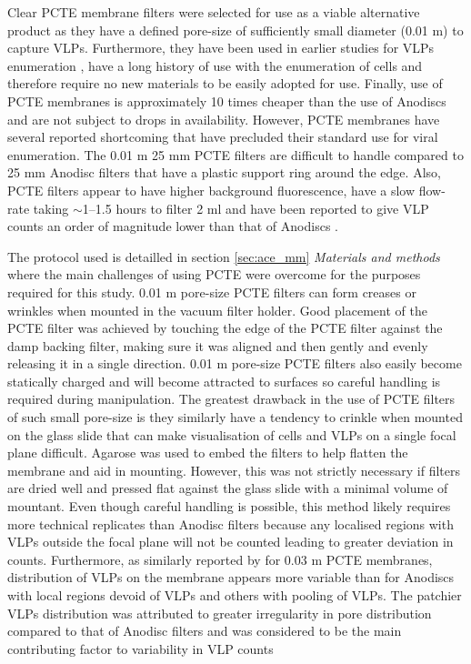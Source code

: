 Clear \ac{PCTE} membrane filters were selected for use as a viable alternative product as they have a defined pore-size of sufficiently small diameter (0.01 \textmu{}m) to capture \acp{VLP}. 
Furthermore, they have been used in earlier studies for \acp{VLP} enumeration \cite{Hara1991, Proctor1992}, have a long history of use with the enumeration of cells \cite{Hobbie1977} and therefore require no new materials to be easily adopted for use.
Finally, use of \ac{PCTE} membranes is approximately 10 times cheaper than the use of Anodiscs and are not subject to drops in availability.
However, \ac{PCTE} membranes have several reported shortcoming that have precluded their standard use for viral enumeration.
The 0.01 \textmu{}m 25 mm \ac{PCTE} filters are difficult to handle compared to 25 mm Anodisc filters that have a plastic support ring around the edge.
Also, \ac{PCTE} filters appear to have higher background fluorescence, have a slow flow-rate taking $\sim$1--1.5 hours to filter 2 ml \cite{Hara1991} and have been reported to give \ac{VLP} counts an order of magnitude lower than that of Anodiscs \cite{Budinoff2011}.%

The protocol used is detailled in section \ref{sec:ace_mm} \emph{Materials and methods} where the main challenges of using \ac{PCTE} were overcome for the purposes required for this study.
0.01 \textmu{}m pore-size \ac{PCTE} filters can form creases or wrinkles when mounted in the vacuum filter holder.
Good placement of the \ac{PCTE} filter was achieved by touching the edge of the \ac{PCTE} filter against the damp backing filter, making sure it was aligned and then gently and evenly releasing it in a single direction. 
0.01 \textmu{}m pore-size \ac{PCTE} filters also easily become statically charged and will become attracted to surfaces so careful handling is required during manipulation. 
The greatest drawback in the use of \ac{PCTE} filters of such small pore-size is they similarly have a tendency to crinkle when mounted on the glass slide that can make visualisation of cells and \acp{VLP} on a single focal plane difficult.
Agarose was used to embed the filters to help flatten the membrane and aid in mounting.
However, this was not strictly necessary if filters are dried well and pressed flat against the glass slide with a minimal volume of mountant.
Even though careful handling is possible, this method likely requires more technical replicates than Anodisc filters because any localised regions with \acp{VLP} outside the focal plane will not be counted leading to greater deviation in counts.
Furthermore, as similarly reported by \citet{Diemer2012} for 0.03 \textmu{}m \ac{PCTE} membranes, distribution of \acp{VLP} on the membrane appears more variable than for Anodiscs with local regions devoid of \acp{VLP} and others with pooling of \acp{VLP}.
The patchier \acp{VLP} distribution was attributed to greater irregularity in pore distribution compared to that of Anodisc filters and was considered to be the main contributing factor to variability in \ac{VLP} counts \cite{Diemer2012}

